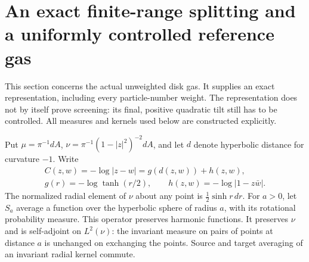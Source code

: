 \documentclass[11pt]{article}
\theoremstyle{remark}\newtheorem{remark}[theorem]{Remark}
\begin{document}
\section{An exact finite-range splitting and a uniformly controlled reference gas}
\label{sec:exact-smearing-reference}

This section concerns the actual unweighted disk gas.  It supplies an exact
representation, including every particle-number weight.  The representation
does not by itself prove screening: its final, positive quadratic tilt still
has to be controlled.  All measures and kernels used below are constructed
explicitly.

Put $\mu=\pi^{-1}dA$, $\nu=\pi^{-1}(1-|z|^2)^{-2}dA$, and let $d$ denote
hyperbolic distance for curvature $-1$.  Write
\[
 \begin{gathered}
 C(z,w)=-\log|z-w|=g(d(z,w))+h(z,w),\\
 g(r)=-\log\tanh(r/2),\qquad h(z,w)=-\log|1-z\bar w|.
 \end{gathered}
\]
The normalized radial element of $\nu$ about any point is
$\frac12\sinh r\,dr$.  For $a>0$, let $S_a$ average a function over the
hyperbolic sphere of radius $a$, with its rotational probability measure.
This operator preserves harmonic functions.  It preserves $\nu$ and is
self-adjoint on $L^2(\nu)$: the invariant measure on pairs of points at
distance $a$ is unchanged on exchanging the points.  Source and target
averaging of an invariant radial kernel commute.
\end{document}
